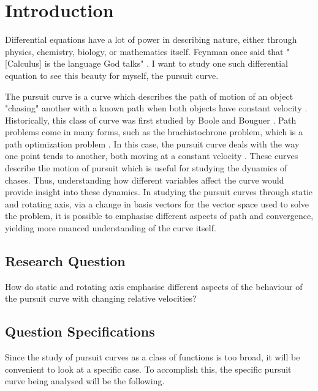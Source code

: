 \documentclass[pstricks, border=12pt]{article}
\begin{document}


\section{Introduction}
Differential equations have a lot of power in describing nature, either through physics, chemistry, biology, or mathematics itself. Feynman once said that "[Calculus] is the language God talks" \cite{strogatz_2021}. I want to study one such differential equation to see this beauty for myself, the pursuit curve.

The pursuit curve is a curve which describes the path of motion of an object "chasing" another with a known path when both objects have constant velocity \cite{wolframalpha_2022}. Historically, this class of curve was first studied by Boole and Bouguer \cite{lloyd_2006}. Path problems come in many forms, such as the brachistochrone problem, which is a path optimization problem \cite{sanchis}. In this case, the pursuit curve deals with the way one point tends to another, both moving at a constant velocity \cite{wolframalpha_2022}. These curves describe the motion of pursuit which is useful for studying the dynamics of chases. Thus, understanding how different variables affect the curve would provide insight into these dynamics. In studying the pursuit curves through static and rotating axis, via a change in basis vectors for the vector space used to solve the problem, it is possible to emphasise different aspects of path and convergence, yielding more nuanced understanding of the curve itself.

\subsection{Research Question}
    How do static and rotating axis emphasise different aspects of the behaviour of the pursuit curve with changing relative velocities?
    
\subsection{Question Specifications}
Since the study of pursuit curves as a class of functions is too broad, it will be convenient to look at a specific case. To accomplish this, the specific pursuit curve being analysed will be the following. \\
\end{document}
